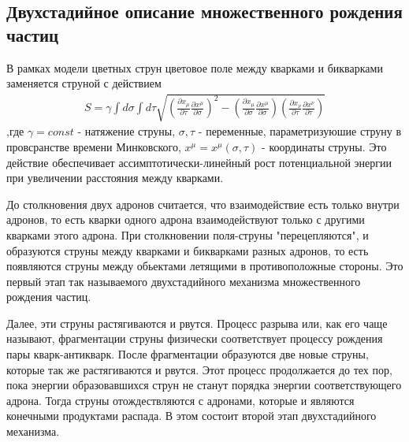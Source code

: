\documentclass[12pt]{article}
\renewcommand{\l}{\left( }
\renewcommand{\r}{\right) }
\newcommand{\pd}{\partial}
\newcommand{\br}[1]{\l {#1} \r}
\begin{document}
\subsection{Двухстадийное описание множественного рождения частиц}
\qquad В рамках модели цветных струн цветовое поле между кварками и бикварками заменяется струной с действием
\begin{gather}
\label{string_action}
S = \gamma \int d\sigma \int d\tau \sqrt{\br{\frac{\pd x_\mu}{\pd \tau} \frac{\pd x^\mu}{\pd \sigma}}^2 - \br{\frac{\pd x_\mu}{\pd \sigma} \frac{\pd x^\mu}{\pd \sigma}} \br{\frac{\pd x_\nu}{\pd \tau} \frac{\pd x^\nu}{\pd \tau}}}
\end{gather}
,где $\gamma=const$ - натяжение струны, $\sigma, \tau$ - переменные, параметризуюшие струну в провсранстве времени Минковского, $x^\mu=x^\mu \br{\sigma, \tau}$ - координаты струны. Это действие обеспечивает ассимптотически-линейный рост потенциальной энергии при увеличении расстояния между кварками.

До столкновения двух адронов считается, что взаимодействие есть только внутри адронов, то есть кварки одного адрона взаимодействуют только с другими кварками этого адрона. При столкновении поля-струны "перецепляются", и образуются струны между кварками и бикварками разных адронов, то есть появляются струны между обьектами летящими в противоположные стороны. Это первый этап так называемого двухстадийного механизма множественного рождения частиц. 

Далее, эти струны растягиваются и рвутся. Процесс разрыва или, как его чаще называют, фрагментации струны физически соответствует процессу рождения пары кварк-антикварк. После фрагментации образуются две новые струны, которые так же растягиваются и рвутся. Этот процесс продолжается до тех пор, пока энергии образовавшихся струн не станут порядка энергии соответствующего адрона. Тогда струны отождествляются с адронами, которые и являются конечными продуктами распада. В этом состоит второй этап двухстадийного механизма.
\end{document}
